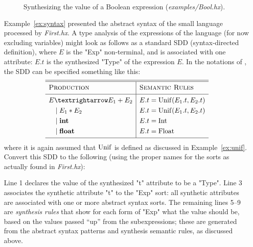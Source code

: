 \documentclass[11pt]{article} %
\begin{document}
\begin{figure}[p]
  \caption{Synthesizing the value of a Boolean expression (\emph{examples/Bool.hx}).}
  \label{fig:bool}
\end{figure}

\begin{example}\label{ex:collect}
  Example~\ref{ex:syntax} presented the abstract syntax of the small language processed by
  \emph{First.hx}. A type analysis of the expressions of the language (for now excluding variables)
  might look as follows as a standard SDD (syntax-directed definition), where $E$ is the "Exp"
  non-terminal, and is associated with one attribute: $E.t$ is the synthesized "Type" of the
  expression $E$.  In the notations of \cite{Aho+:2006}, the SDD can be specified something like
  this:
  \begin{equation*}
    \begin{array}{l|l}
      \hline
      \hline
      \textsc{Production}  & \textsc{Semantic Rules} \Bigstrut\\
      \hline
      E → E_1 + E_2 & E.t = \op{Unif}(E_1.t, E_2.t) \Bigstrut\\[\jot]
      \quad\mid E_1 \ast E_2 & E.t = \op{Unif}(E_1.t, E_2.t) \\[\jot]
      \quad\mid \textbf{int} & E.t = \op{Int} \\[\jot]
      \quad\mid \textbf{float} & E.t = \op{Float} \\[\jot]
      \hline
    \end{array}
  \end{equation*}
  where it is again assumed that $\operatorname{Unif}$ is defined as discussed in Example~\ref{ex:unif}.
  Convert this SDD to the following \HAX (using the proper names for the sorts as actually found in
  \emph{First.hx}):
  Line 1 declares the value of the synthesized "t" attribute to be a "Type".
  Line 3 associates the synthetic attribute "t" to the "Exp" sort: all synthetic attributes are
  associated with one or more abstract syntax sorts.
  The remaining lines 5--9 are \emph{synthesis rules} that show for each form of "Exp" what the
  value should be, based on the values passed ``up'' from the subexpressions; these are generated
  from the abstract syntax patterns and synthesis semantic rules, as discussed above.
\end{example}
\end{document}
